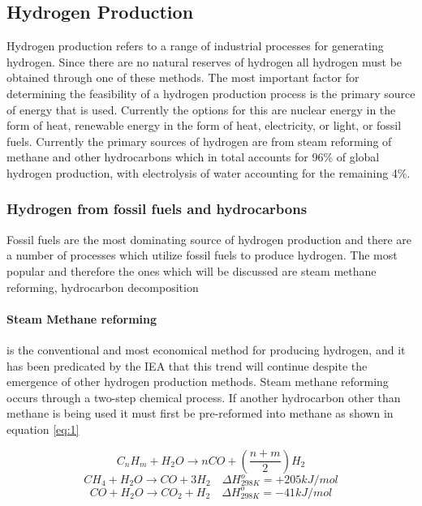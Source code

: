 \subsection{Hydrogen Production}
Hydrogen production refers to a range of industrial processes for generating hydrogen. 
Since there are no natural reserves of hydrogen all hydrogen must be obtained through one of these methods. 
The most important factor for determining the feasibility of a hydrogen production process is the primary 
source of energy that is used. Currently the options for this are nuclear energy in the form of heat, 
renewable energy in the form of heat, electricity, or light, or fossil fuels. 
Currently the primary sources of hydrogen are from steam reforming of methane and other hydrocarbons which 
in total accounts for 96\% of global hydrogen production, with electrolysis of water accounting for the 
remaining 4\%.
\subsubsection{Hydrogen from fossil fuels and hydrocarbons}
Fossil fuels are the most dominating source of hydrogen production and there are a number of processes which 
utilize fossil fuels to produce hydrogen. The most popular and therefore the ones which will be discussed 
are steam methane reforming, hydrocarbon decomposition
\paragraph{Steam Methane reforming}
is the conventional and most economical method for producing hydrogen, and it has been predicated by the 
IEA that this trend will continue despite the emergence of other hydrogen production methods. 
Steam methane reforming occurs through a two-step chemical process. If another hydrocarbon other than 
methane is being used it must first be pre-reformed into methane as shown in equation \ref{eq:1}

\begin{equation} \label{eq:1}
    C_n H_m + H_2 O \rightarrow nCO +(\frac{n+m}{2})H_2 
\end{equation}
\begin{equation}\label{eq:2}
    CH_4 + H_2 O \rightarrow CO + 3H_2 \quad \Delta H_{298K}^o = +205 kJ/mol
\end{equation}
\begin{equation}\label{eq:3}
    CO+ H_2 O \rightarrow CO_2 + H_2 \quad \Delta H_{298K}^o = -41 kJ/mol
\end{equation}

